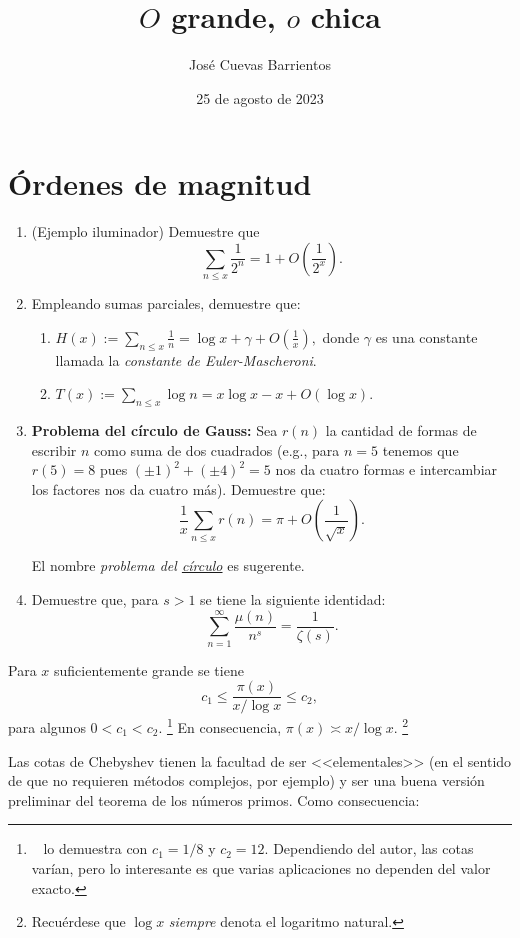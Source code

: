 \documentclass[11pt, reqno]{amsart}
\title{$O$ grande, $o$ chica}
\date{25 de agosto de 2023}
\author[José Cuevas]{José Cuevas Barrientos}
\begin{document}
\maketitle

\section{Órdenes de magnitud}
\begin{enumerate}
	\item (Ejemplo iluminador) Demuestre que
		$$ \sum_{n \le x} \frac{1}{2^n} = 1 + O\left( \frac{1}{2^x} \right). $$

	\item Empleando sumas parciales, demuestre que:
		\begin{enumerate}
			\item $\displaystyle H(x) := \sum_{n \le x} \frac{1}{n} = \log x + \gamma + O\left( \frac{1}{x} \right),$ donde $ \gamma$ es una constante
				llamada la \textit{constante de Euler-Mascheroni}.
			\item $\displaystyle T(x) := \sum_{n \le x} \log n = x\log x - x + O(\log x)$.
		\end{enumerate}

	\item \textbf{Problema del círculo de Gauss:} Sea $r(n)$ la cantidad de formas de escribir $n$ como suma de dos cuadrados
		(e.g., para $n = 5$ tenemos que $r(5) = 8$ pues $(\pm 1)^2 + (\pm 4)^2 = 5$ nos da cuatro formas e intercambiar
		los factores nos da cuatro más).
		Demuestre que:
		$$ \frac{1}{x} \sum_{n\le x} r(n) = \pi + O\left( \frac{1}{\sqrt{x}} \right). $$

		\begin{hint}
			El nombre \textit{problema del \underline{círculo}} es sugerente.
		\end{hint}
	\item Demuestre que, para $s > 1$ se tiene la siguiente identidad:
		$$ \sum_{n=1}^{\infty} \frac{\mu(n)}{n^s} = \frac{1}{\zeta(s)}. $$
\end{enumerate}

\begin{thm}
	Para $x$ suficientemente grande se tiene
	$$ c_1 \le \frac{\pi(x)}{x / \log x} \le c_2, $$
	para algunos $0 < c_1 < c_2$.%
	\footnote{\citeauthor{hua:number}~\cite[82]{hua:number} lo demuestra con $c_1 = 1/8$ y $c_2 = 12$.
	Dependiendo del autor, las cotas varían, pero lo interesante es que varias aplicaciones no dependen del valor exacto.}
	En consecuencia, $\pi(x) \asymp x/\log x$.%
	\footnote{Recuérdese que $\log x$ \textit{siempre} denota el logaritmo natural.}
\end{thm}
Las cotas de Chebyshev tienen la facultad de ser <<elementales>> (en el sentido de que no requieren métodos complejos, por ejemplo)
y ser una buena versión preliminar del teorema de los números primos.
Como consecuencia:
\end{document}
